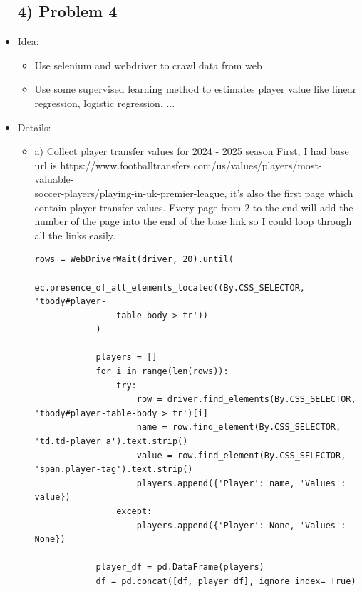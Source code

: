 \documentclass[a4paper,12pt]{article}
\begin{document}
\begin{itemize}[label= {*}, leftmargin= 1cm]
    \subsection*{4) Problem 4}
    \item {\Large Idea:}
    \begin{itemize}[label= {-}, leftmargin= 1cm]
        \item Use selenium and webdriver to crawl data from web
        \item Use some supervised learning method to estimates player value like linear regression, logistic regression, ...
    \end{itemize}
    \item {\Large Details:}
    \begin{itemize}[label= {}, leftmargin= 1cm]
        \item a) Collect player transfer values for 2024 - 2025 season
        First, I had base url is https://www.footballtransfers.com/us/values/players/most-valuable-\\
        soccer-players/playing-in-uk-premier-league, it's also the first page which contain player transfer values. Every page from 2 to the end will add the number of the page into the end of the base link so I could loop through all the links easily. 
        \vspace{0.3cm}

        \begin{Verbatim}[fontsize=\footnotesize, xleftmargin= -2cm]
            rows = WebDriverWait(driver, 20).until(
                ec.presence_of_all_elements_located((By.CSS_SELECTOR, 'tbody#player-
                table-body > tr'))
            )

            players = []
            for i in range(len(rows)):
                try:
                    row = driver.find_elements(By.CSS_SELECTOR, 'tbody#player-table-body > tr')[i]
                    name = row.find_element(By.CSS_SELECTOR, 'td.td-player a').text.strip()
                    value = row.find_element(By.CSS_SELECTOR, 'span.player-tag').text.strip()
                    players.append({'Player': name, 'Values': value})
                except:
                    players.append({'Player': None, 'Values': None})
                    
            player_df = pd.DataFrame(players)
            df = pd.concat([df, player_df], ignore_index= True)
        \end{Verbatim}
        \vspace{0.3cm}
        

\end{itemize}
\end{itemize}
\end{document}
